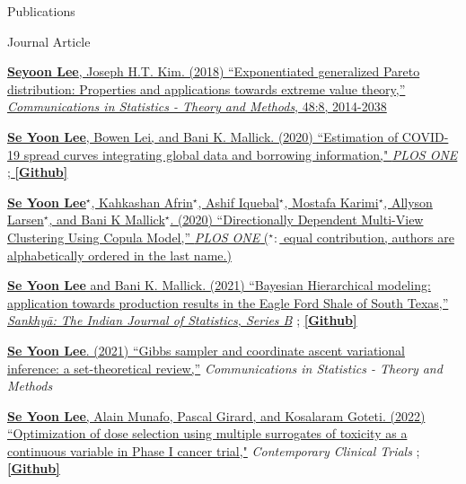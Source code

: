 \documentclass{resume} %
\begin{document}
\begin{rSection}{Publications}
\begin{rSubsection}{Journal Article}{}{}{}
\item[] [1] \href{https://www.tandfonline.com/doi/pdf/10.1080/03610926.2018.1441418?needAccess=true}
{\underline{\textbf{Seyoon Lee}}, Joseph H.T. Kim. (2018) ``Exponentiated generalized Pareto distribution:
Properties and applications towards extreme
value theory,''
\textit{Communications in Statistics - Theory and Methods},
 48:8, 2014-2038}
\item[] [2] \href{https://journals.plos.org/plosone/article?id=10.1371/journal.pone.0236860}
{\underline{\textbf{Se Yoon Lee}}, Bowen Lei, and Bani K. Mallick. (2020)
``Estimation of COVID-19 spread curves integrating global data and borrowing information," \textit{PLOS ONE}
;
\href{https://github.com/StevenBoys/BHRM}{\underline{\textbf{[Github]}}}
}
\item[] [3] 
\href{https://journals.plos.org/plosone/article?id=10.1371/journal.pone.0238996}
{\underline{\textbf{Se Yoon Lee}}$^\star$, Kahkashan Afrin$^\star$, Ashif Iquebal$^\star$, Mostafa Karimi$^\star$, Allyson Larsen$^\star$, and Bani K Mallick$^\star$. (2020)
``Directionally Dependent Multi-View Clustering Using Copula Model,'' \textit{PLOS ONE} ($^\star:$ equal contribution, authors are alphabetically ordered in the last name.)}
\item[] [4]
\href{https://rdcu.be/ceg4p}
{\underline{\textbf{Se Yoon Lee}} and Bani K. Mallick. (2021)
``Bayesian Hierarchical modeling: application towards
production results in the Eagle Ford Shale of South Texas,'' \textit{Sankhyā: The Indian Journal of Statistics, Series B}}
;
\href{https://github.com/yain22/SWM}{\underline{\textbf{[Github]}}}
\item[] [5]
\href{https://www.tandfonline.com/doi/full/10.1080/03610926.2021.1921214?src=}
{\underline{\textbf{Se Yoon Lee}}. (2021)
``Gibbs sampler and coordinate ascent variational inference: a set-theoretical review,''}
\textit{Communications in Statistics - Theory and Methods}
\item[][6]
\href{https://www.sciencedirect.com/science/article/pii/S1551714421003931}
{\underline{\textbf{Se Yoon Lee}}, Alain Munafo, Pascal Girard, and Kosalaram Goteti. (2022)
``Optimization of dose selection using multiple surrogates of toxicity as a continuous variable in Phase I cancer trial,"}
\textit{Contemporary Clinical Trials} 
;
\href{https://github.com/yain22/2PLD}{\underline{\textbf{[Github]}}}

\end{rSubsection}
\end{rSection}
\end{document}
